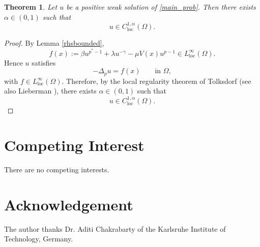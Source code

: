 \documentclass[12pt]{extarticle}
\newtheorem{theorem}{Theorem}[section]
\theoremstyle{definition}
\theoremstyle{remark}
\theoremstyle{definition}
\numberwithin{equation}{section}
\numberwithin{equation}{section}
\begin{document}
	\begin{theorem}\label{holderregularity}
		Let $u$ be a positive weak solution of \eqref{main_prob}. Then there exists
		$\alpha\in(0,1)$ such that
		\[
		u\in C^{1,\alpha}_{\mathrm{loc}}(\Omega).
		\]
	\end{theorem}
	
	\begin{proof}
		By Lemma \ref{rhsbounded},
		\[
		f(x):=\beta u^{p^*-1}+\lambda u^{-\gamma}-\mu V(x)u^{p-1}
		\in L^\infty_{\mathrm{loc}}(\Omega).
		\]
		Hence $u$ satisfies
		\[
		-\Delta_p u=f(x)
		\qquad \text{in } \Omega,
		\]
		with $f\in L^\infty_{\mathrm{loc}}(\Omega)$. Therefore, by the local regularity theorem of Tolksdorf \cite{Tolksdorf1984} (see also Lieberman \cite{Lieberman1988,Lieberman1991}), there exists $\alpha\in(0,1)$ such that
		\[
		u\in C^{1,\alpha}_{\mathrm{loc}}(\Omega).
		\]
	\end{proof}
		
	
	
	\section*{Competing Interest}
	There are no competing interests.
	
	\section*{Acknowledgement}	
	The author thanks Dr. Aditi Chakrabarty of the Karlsruhe Institute of Technology, Germany.
	
\end{document}
